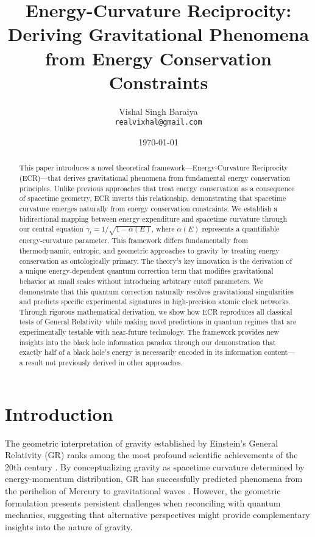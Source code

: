 \documentclass[11pt,a4paper]{article}
\title{\Large \textbf{Energy-Curvature Reciprocity:}\\ 
\normalsize \textbf{Deriving Gravitational Phenomena from Energy Conservation Constraints}}
\author{Vishal Singh Baraiya\\
\small \texttt{realvixhal@gmail.com}}
\date{\today}
\begin{document}
\maketitle

\begin{abstract}
\noindent This paper introduces a novel theoretical framework—Energy-Curvature Reciprocity (ECR)—that derives gravitational phenomena from fundamental energy conservation principles. Unlike previous approaches that treat energy conservation as a consequence of spacetime geometry, ECR inverts this relationship, demonstrating that spacetime curvature emerges naturally from energy conservation constraints. We establish a bidirectional mapping between energy expenditure and spacetime curvature through our central equation $\gamma_t = 1/\sqrt{1-\alpha(E)}$, where $\alpha(E)$ represents a quantifiable energy-curvature parameter. This framework differs fundamentally from thermodynamic, entropic, and geometric approaches to gravity by treating energy conservation as ontologically primary. The theory's key innovation is the derivation of a unique energy-dependent quantum correction term that modifies gravitational behavior at small scales without introducing arbitrary cutoff parameters. We demonstrate that this quantum correction naturally resolves gravitational singularities and predicts specific experimental signatures in high-precision atomic clock networks. Through rigorous mathematical derivation, we show how ECR reproduces all classical tests of General Relativity while making novel predictions in quantum regimes that are experimentally testable with near-future technology. The framework provides new insights into the black hole information paradox through our demonstration that exactly half of a black hole's energy is necessarily encoded in its information content—a result not previously derived in other approaches.
\end{abstract}

\section{Introduction}\label{sec:intro}

The geometric interpretation of gravity established by Einstein's General Relativity (GR) ranks among the most profound scientific achievements of the 20th century \cite{einstein1916}. By conceptualizing gravity as spacetime curvature determined by energy-momentum distribution, GR has successfully predicted phenomena from the perihelion of Mercury to gravitational waves \cite{abbott2016}. However, the geometric formulation presents persistent challenges when reconciling with quantum mechanics, suggesting that alternative perspectives might provide complementary insights into the nature of gravity.
\end{document}
